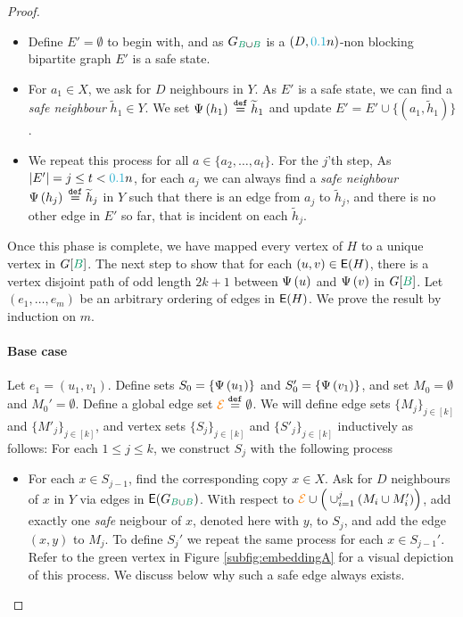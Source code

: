 \documentclass[11pt]{article}
\begin{document}
\begin{proof}
\begin{itemize}
\item Define $E' = \emptyset$ to begin with, and as $\BipartiteG$ is a $(D, \epsilonA n)$-non blocking bipartite graph  $E'$ is a safe state.
  
\item For $a_1 \in X$, we ask for $D$ neighbours in $Y$. As $E'$ is a safe state, we can find a \emph{safe neighbour} $\tilde{h}_1 \in Y$. We set $\Psi\left(h_1\right) \text{}\overset{\mathtt{def}}{=} \widetilde{h}_1$ and update $E' = E'  \cup \{(a_1, \tilde{h}_1)\}$.
  
\item We repeat this process for all $a \in \{a_2, \dots, a_t\}$. For the $j$'th step, As $|E'| = j \leq t < \epsilonA n$, for each $a_j$ we can always find a \emph{safe neighbour} $\Psi\left(h_j\right) \text{}\overset{\mathtt{def}}{=} \widetilde{h}_j$ in $Y$ such that there is an edge from $a_j$ to $\tilde{h}_j$, and there is no other edge in $E'$ so far, that is incident on each $\tilde{h}_j$.
  
\end{itemize}

Once this phase is complete, we have mapped every vertex of $H$ to a unique vertex in $G[\GreenB]$.
The next step to show that for each $(u,v) \in \mathsf{E}(H)$, there is a vertex disjoint path of odd length $2k+1$ between $\Psi\left(u\right)$ and $\Psi\left(v\right)$ in $G[\GreenB]$.
Let $(e_1, \dots, e_m)$ be an arbitrary ordering of edges in $\mathsf{E}(H)$.
We prove the result by induction on $m$.

\paragraph{Base case} 

Let $e_1 = (u_1,v_1)$. Define sets $S_0 = \{\Psi\left(u_1\right)\}$ and $S'_0 = \{ \Psi\left(v_1\right)\}$, and set $M_0 = \emptyset$ and $M_0' = \emptyset$.
Define a global edge set  $\textcolor{orange}{\mathcal{E}} \text{}\overset{\mathtt{def}}{=} \emptyset$.
We will define edge sets $\{ M_j\}_{j \in [k]}$ and $ \{ M'_j\}_{j \in [k]}$, and vertex sets $\{ S_j\}_{j \in [k]}$ and $\{ S'_j\}_{j \in [k]}$ inductively as follows: For each $1 \leq j \leq k$, we construct $S_{j}$ with the following process

\begin{itemize}
\item {For each $x \in S_{j-1}$, find the corresponding copy $x \in X$. Ask for $D$ neighbours of $x$ in $Y$ via edges in $\Edges{\BipartiteG}$.
    With respect to $\textcolor{orange}{\mathcal{E}} \cup \Big(\cup_{i=1}^{j} (M_i \cup M'_i)\Big)$, add exactly one \emph{safe} neigbour of $x$, denoted here with $y$, to $S_{j}$, and add the edge $(x,y)$ to $M_j$.
    To define $S_j'$ we repeat the same process for each $x \in S_{j-1}'$.
    Refer to the green vertex in Figure \ref{subfig:embeddingA} for a visual depiction of this process.  We discuss below why such a safe edge always exists.}
  

\end{itemize}
\end{proof}
\end{document}
